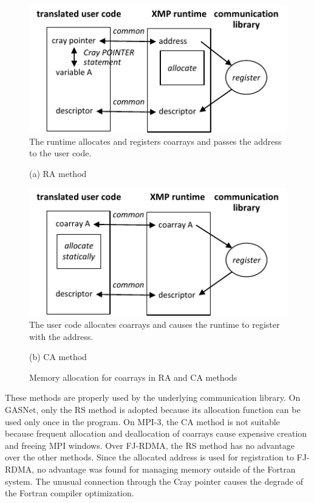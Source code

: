 \begin{figure}[tbh]
 \begin{center}
  \includegraphics[scale=0.9, trim=0mm 0mm 0mm 0mm, clip]{figs/register-RA-tmp.pdf}\\
The runtime allocates and registers coarrays and passes the address to the user code.
 \end{center}
 \begin{center}
(a) RA method
 \end{center}
 \begin{center}
  \includegraphics[scale=0.9, trim=0mm 0mm 0mm 0mm, clip]{figs/register-CA-tmp.pdf}\\
The user code allocates coarrays and causes the runtime to register with the address.
 \end{center}
 \begin{center}
(b) CA method
 \end{center}
 \caption{Memory allocation for coarrays in RA and CA methods}
 \label{fig:register-RA-CA}
\end{figure}

These methods are properly used by the underlying communication library.
%
On GASNet, only the RS method is adopted because its allocation function
can be used only once in the program.
%
On MPI-3, the CA method is not suitable because frequent 
allocation and deallocation of coarrays cause expensive creation and freeing 
MPI windows.
%
Over FJ-RDMA, the RS method has no advantage over the other methods.
Since the allocated address is used for registration to FJ-RDMA, 
no advantage was found for managing memory outside of the Fortran system. 
The unusual connection through the Cray pointer causes the degrade of 
the Fortran compiler optimization.


